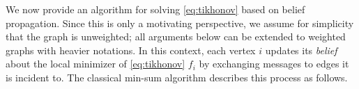 \documentclass[letterpaper]{article} %
\begin{document}
We now provide an algorithm for solving \eqref{eq:tikhonov} based on belief propagation. Since this is only a motivating perspective, we assume for simplicity that the graph is unweighted; all arguments below can be extended to weighted graphs with heavier notations. In this context, each vertex $i$ updates its \textit{belief} about the local minimizer of \eqref{eq:tikhonov} $f_i$ by exchanging messages to edges it is incident to. The classical min-sum algorithm \cite{min_Sum} describes this process as follows. 
\end{document}
